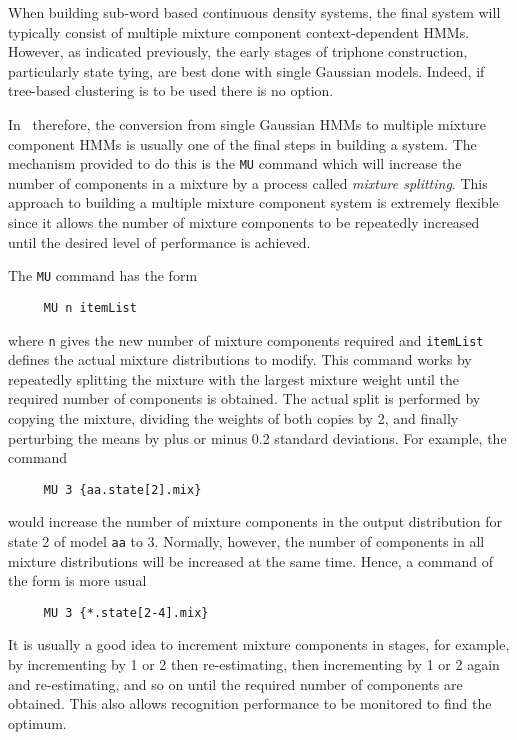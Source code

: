 
When building sub-word based continuous density systems, 
the final system will typically consist of multiple mixture component
context-dependent HMMs.  However, as indicated previously, the early
stages of triphone construction, particularly state tying, are best done
with single Gaussian models.  Indeed, if tree-based clustering is to be
used there is no option.

In \HTK\ therefore, the conversion from single Gaussian HMMs to multiple
mixture component HMMs is usually one of the final steps in building
a system.  The mechanism provided to do this is the  \texttt{MU} command
which will increase the number of components in a mixture by 
a process called \textit{mixture splitting}.
This approach to building a multiple
mixture component system is extremely
flexible since it allows the number of mixture components to be repeatedly increased
until the desired level of performance is achieved.

The \texttt{MU} command has the form
\begin{verbatim}
     MU n itemList
\end{verbatim}
where \texttt{n} gives the new number of mixture components required and
\texttt{itemList} defines the actual mixture distributions to modify.  This
command works by repeatedly splitting the mixture with the largest mixture
weight until the required number of components is obtained.  The actual
split is performed by copying the mixture, dividing the weights of both
copies by 2, and finally perturbing the means by plus or minus 0.2 standard
deviations.
For example, the command
\begin{verbatim}
     MU 3 {aa.state[2].mix}
\end{verbatim}
would increase the number of mixture components in the output distribution
for state 2 of model \texttt{aa} to 3.   Normally, however,  the number of
components in all mixture distributions will be increased at the same time.
Hence, a command of the form is more usual
\begin{verbatim}
     MU 3 {*.state[2-4].mix}
\end{verbatim}
It is usually a good idea to increment mixture components in
stages, for example, by incrementing by 1 or 2 then re-estimating, then
incrementing by 1 or 2 again and re-estimating, and so on until the
required number of components are obtained.  This also allows recognition performance
to be monitored to find the optimum.

